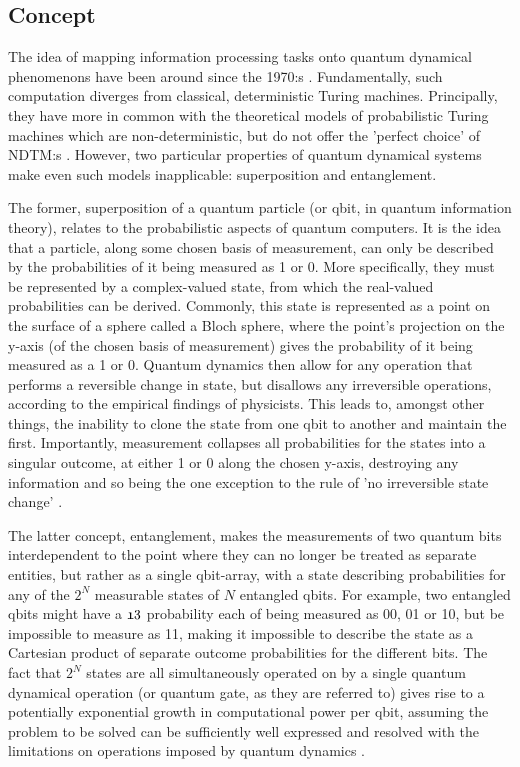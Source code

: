 \documentclass[msc,lith,english]{liuthesis}
\begin{document}
\subsection{Concept}
The idea of mapping information processing tasks onto quantum dynamical phenomenons have been around since the 1970:s \cite{QCQI}. Fundamentally, such computation diverges from classical, deterministic Turing machines. Principally, they have more in common with the theoretical models of probabilistic Turing machines which are non-deterministic, but do not offer the 'perfect choice' of NDTM:s \cite{CCAMA}. However, two particular properties of quantum dynamical systems make even such models inapplicable: superposition and entanglement. 

The former, superposition of a quantum particle (or qbit, in quantum information theory), relates to the probabilistic aspects of quantum computers. It is the idea that a particle, along some chosen basis of measurement, can only be described by the probabilities of it being measured as 1 or 0. More specifically, they must be represented by a complex-valued state, from which the real-valued probabilities can be derived. Commonly, this state is represented as a point on the surface of a sphere called a Bloch sphere, where the point's projection on the y-axis (of the chosen basis of measurement) gives the probability of it being measured as a 1 or 0. Quantum dynamics then allow for any operation that performs a reversible change in state, but disallows any irreversible operations, according to the empirical findings of physicists. This leads to, amongst other things, the inability to clone the state from one qbit to another and maintain the first. Importantly, measurement collapses all probabilities for the states into a singular outcome, at either 1 or 0 along the chosen y-axis, destroying any information and so being the one exception to the rule of 'no irreversible state change' \cite{QCQI}.

The latter concept, entanglement, makes the measurements of two quantum bits interdependent to the point where they can no longer be treated as separate entities, but rather as a single qbit-array, with a state describing probabilities for any of the $2^N$ measurable states of $N$ entangled qbits. For example, two entangled qbits might have a $\frak{1}{3}$ probability each of being measured as 00, 01 or 10, but be impossible to measure as 11, making it impossible to describe the state as a Cartesian product of separate outcome probabilities for the different bits. The fact that $2^N$ states are all simultaneously operated on by a single quantum dynamical operation (or quantum gate, as they are referred to) gives rise to a potentially exponential growth in computational power per qbit, assuming the problem to be solved can be sufficiently well expressed and resolved with the limitations on operations imposed by quantum dynamics \cite{QCQI}\cite{EIQC}. 
\end{document}
